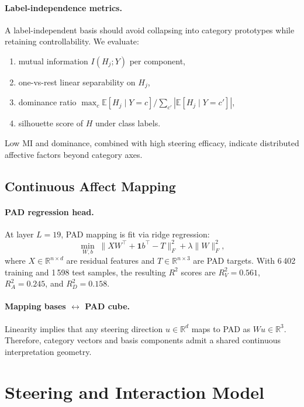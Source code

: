\paragraph{Label-independence metrics.}
\label{sec:dev:basis:metrics}
A label-independent basis should avoid collapsing into category
prototypes while retaining controllability. We evaluate:
\begin{enumerate}
  \item mutual information $I(H_j;Y)$ per component,
  \item one-vs-rest linear separability on $H_j$,
  \item dominance ratio
    $\max_c\mathbb{E}[H_j\mid Y=c]/\sum_{c'}|\mathbb{E}[H_j\mid Y=c']|$,
  \item silhouette score of $H$ under class labels.
\end{enumerate}
Low MI and dominance, combined with high steering efficacy, indicate
distributed affective factors beyond category axes.

\subsection{Continuous Affect Mapping}
\label{sec:dev:vad}

\paragraph{PAD regression head.}
\label{sec:dev:vad:head}
At layer $L=19$, PAD mapping is fit via ridge regression:
\begin{equation}
  \min_{W,b}\;\|XW^\top+\mathbf{1}b^\top-T\|_F^2+\lambda\|W\|_F^2,
\end{equation}
where $X\in\mathbb{R}^{n\times d}$ are residual features and
$T\in\mathbb{R}^{n\times 3}$ are PAD targets.
With 6\,402 training and 1\,598 test samples, the resulting
$R^2$ scores are $R^2_V=0.561$, $R^2_A=0.245$, and $R^2_D=0.158$.

\paragraph{Mapping bases $\leftrightarrow$ PAD cube.}
\label{sec:dev:vad:bridge}
Linearity implies that any steering direction
$u\in\mathbb{R}^{d}$ maps to PAD as $Wu\in\mathbb{R}^{3}$. Therefore,
category vectors and basis components admit a shared continuous
interpretation geometry.

\section{Steering and Interaction Model}
\label{sec:dev:steering}

